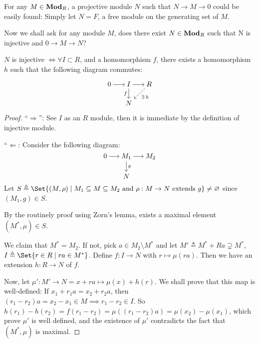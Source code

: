 For any $M \in \mathbf{Mod}_R$, a projective module $N$ such that $N \to M \to 0$ could
be easily found: Simply let $N = F$, a free module on the generating set of $M$.

Now we shall ask for any module $M$, does there exist $N \in \mathbf{Mod}_R$ such that
N is injective and $0 \to M \to N$?

\begin{theorem} \label{thm:boers-criterion}
  $N$ is injective $\iff \forall I \subset R$, and a homomorphism
  $f$, there exists a homomorphism $h$
  such that the following diagram commutes:

  \[ \begin{tikzcd}[cramped, sep=15pt]
    0 \ar[r] & I \ar[d, "f"'] \ar[r] & R \ar[dashed, dl, "\exists h"] \\
     & N
    \end{tikzcd}
  \]
  \begin{proof}
    ``$\Rightarrow$'': See $I$ as an $R$ module, then it is immediate by the
    definition of injective module.

    ``$\Leftarrow$: Consider the following diagram:
    \[
      \begin{tikzcd}[cramped, sep=15pt]
      0 \ar[r] & M_1 \ar[d, "g"] \ar[r] & M_2  \\
        & N
      \end{tikzcd}
    \]
    Let $S \triangleq \Set{ (M, \rho) \mid M_1 \subseteq M \subseteq M_2
      \text{ and } \rho : M \to N \text{ extends } g} \neq \varnothing$
    since $(M_1, g) \in S$.

    By the routinely proof using Zorn's lemma, exists a maximal element $(M^*, \mu) \in S$.

    We claim that $M^* = M_2$.
    If not, pick $a \in M_2 \setminus M^*$
    and let $M' \triangleq M^* + Ra \supsetneq M^*$,
    $I \triangleq \Set{ r \in R \mid ra \in M^* }$.
    Define $f : I \to N$ with $r \mapsto \mu(ra)$.
    Then we have an extension $h : R \to N$ of $f$.

    Now, let $\mu' :  M' \to N = x + ra \mapsto \mu(x) + h(r)$.
    We shall prove that this map is well-defined:
    If $x_1 + r_1a = x_2 + r_2a$, then $(r_1 - r_2) a = x_2 - x_1 \in M \implies
    r_1 - r_2 \in I$.
    So $h(r_1) - h(r_2) = f(r_1 - r_2) = \mu((r_1 - r_2)a) = \mu(x_2) - \mu(x_1)$,
    which prove $\mu'$ is well defined, and the existence of $\mu'$
    contradicts the fact that $(M^*, \mu)$ is maximal.
  \end{proof}
\end{theorem}


